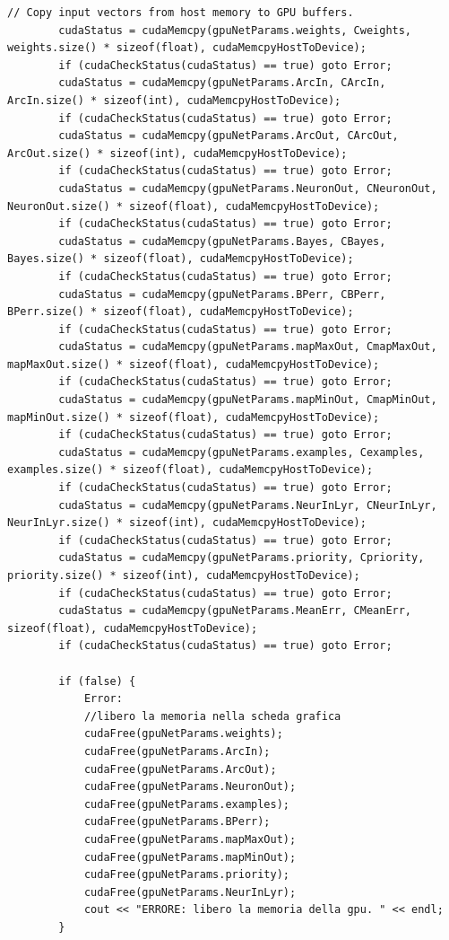 \documentclass[10pt,a4paper]{article}
\begin{document}
\begin{lstlisting}[style=mycuda, caption= classe di interfaccia alla GPU, captionpos=b]
		// Copy input vectors from host memory to GPU buffers.
		cudaStatus = cudaMemcpy(gpuNetParams.weights, Cweights, weights.size() * sizeof(float), cudaMemcpyHostToDevice);
		if (cudaCheckStatus(cudaStatus) == true) goto Error;
		cudaStatus = cudaMemcpy(gpuNetParams.ArcIn, CArcIn, ArcIn.size() * sizeof(int), cudaMemcpyHostToDevice);
		if (cudaCheckStatus(cudaStatus) == true) goto Error;
		cudaStatus = cudaMemcpy(gpuNetParams.ArcOut, CArcOut, ArcOut.size() * sizeof(int), cudaMemcpyHostToDevice);
		if (cudaCheckStatus(cudaStatus) == true) goto Error;
		cudaStatus = cudaMemcpy(gpuNetParams.NeuronOut, CNeuronOut, NeuronOut.size() * sizeof(float), cudaMemcpyHostToDevice);
		if (cudaCheckStatus(cudaStatus) == true) goto Error;
		cudaStatus = cudaMemcpy(gpuNetParams.Bayes, CBayes, Bayes.size() * sizeof(float), cudaMemcpyHostToDevice);
		if (cudaCheckStatus(cudaStatus) == true) goto Error;
		cudaStatus = cudaMemcpy(gpuNetParams.BPerr, CBPerr, BPerr.size() * sizeof(float), cudaMemcpyHostToDevice);
		if (cudaCheckStatus(cudaStatus) == true) goto Error;
		cudaStatus = cudaMemcpy(gpuNetParams.mapMaxOut, CmapMaxOut, mapMaxOut.size() * sizeof(float), cudaMemcpyHostToDevice);
		if (cudaCheckStatus(cudaStatus) == true) goto Error;
		cudaStatus = cudaMemcpy(gpuNetParams.mapMinOut, CmapMinOut, mapMinOut.size() * sizeof(float), cudaMemcpyHostToDevice);
		if (cudaCheckStatus(cudaStatus) == true) goto Error;
		cudaStatus = cudaMemcpy(gpuNetParams.examples, Cexamples, examples.size() * sizeof(float), cudaMemcpyHostToDevice);
		if (cudaCheckStatus(cudaStatus) == true) goto Error;
		cudaStatus = cudaMemcpy(gpuNetParams.NeurInLyr, CNeurInLyr, NeurInLyr.size() * sizeof(int), cudaMemcpyHostToDevice);
		if (cudaCheckStatus(cudaStatus) == true) goto Error;
		cudaStatus = cudaMemcpy(gpuNetParams.priority, Cpriority, priority.size() * sizeof(int), cudaMemcpyHostToDevice);
		if (cudaCheckStatus(cudaStatus) == true) goto Error;
		cudaStatus = cudaMemcpy(gpuNetParams.MeanErr, CMeanErr, sizeof(float), cudaMemcpyHostToDevice);
		if (cudaCheckStatus(cudaStatus) == true) goto Error;

		if (false) {
			Error:
			//libero la memoria nella scheda grafica
			cudaFree(gpuNetParams.weights);
			cudaFree(gpuNetParams.ArcIn);
			cudaFree(gpuNetParams.ArcOut);
			cudaFree(gpuNetParams.NeuronOut);
			cudaFree(gpuNetParams.examples);
			cudaFree(gpuNetParams.BPerr);
			cudaFree(gpuNetParams.mapMaxOut);
			cudaFree(gpuNetParams.mapMinOut);
			cudaFree(gpuNetParams.priority);
			cudaFree(gpuNetParams.NeurInLyr);
			cout << "ERRORE: libero la memoria della gpu. " << endl;
		}
			

\end{lstlisting}
\end{document}

